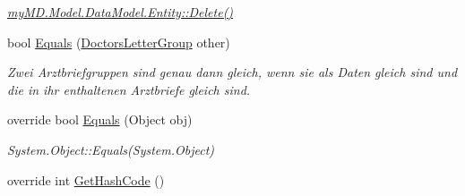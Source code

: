 \begin{CompactItemize}
\begin{CompactList}\small\item\em \hyperlink{classmy_m_d_1_1_model_1_1_data_model_1_1_entity_51a833214dab53bfafb630573fc0fe77}{my\-MD.Model.Data\-Model.Entity::Delete()} \item\end{CompactList}\item 
bool \hyperlink{classmy_m_d_1_1_model_1_1_data_model_1_1_doctors_letter_group_05784e1ab10caf01314e691349e68e2e}{Equals} (\hyperlink{classmy_m_d_1_1_model_1_1_data_model_1_1_doctors_letter_group}{Doctors\-Letter\-Group} other)
\begin{CompactList}\small\item\em Zwei Arztbriefgruppen sind genau dann gleich, wenn sie als Daten gleich sind und die in ihr enthaltenen Arztbriefe gleich sind. \item\end{CompactList}\item 
\hypertarget{classmy_m_d_1_1_model_1_1_data_model_1_1_doctors_letter_group_438d2c1653522e9aff51f785434e952d}{
override bool \hyperlink{classmy_m_d_1_1_model_1_1_data_model_1_1_doctors_letter_group_438d2c1653522e9aff51f785434e952d}{Equals} (Object obj)}
\label{db/dfe/classmy_m_d_1_1_model_1_1_data_model_1_1_doctors_letter_group_438d2c1653522e9aff51f785434e952d}

\begin{CompactList}\small\item\em System.Object::Equals(System.Object) \item\end{CompactList}\item 
\hypertarget{classmy_m_d_1_1_model_1_1_data_model_1_1_doctors_letter_group_871aff832c00675bb79db4294f382e58}{
override int \hyperlink{classmy_m_d_1_1_model_1_1_data_model_1_1_doctors_letter_group_871aff832c00675bb79db4294f382e58}{Get\-Hash\-Code} ()}
\label{db/dfe/classmy_m_d_1_1_model_1_1_data_model_1_1_doctors_letter_group_871aff832c00675bb79db4294f382e58}


\end{CompactItemize}
